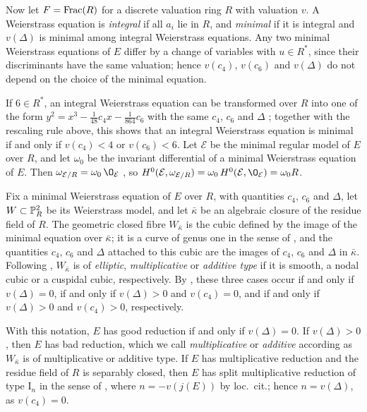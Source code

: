 Now let $F = \operatorname{Frac}(R)$ for a discrete valuation ring $R$ with valuation $v$.
A Weierstrass equation is \emph{integral} if all $a_i$ lie in $R$, and \emph{minimal} if it is integral and $v(\Delta)$ is minimal among integral Weierstrass equations.
Any two minimal Weierstrass equations of $E$ differ by a change of variables with $u\in R^*$, since their discriminants have the same valuation; hence $v(c_4)$, $v(c_6)$ and $v(\Delta)$ do not depend on the choice of the minimal equation.

If $6\in R^*$, an integral Weierstrass equation can be transformed over $R$ into one of the form $y^2 = x^3-\tfrac{1}{48}c_4x-\tfrac{1}{864}c_6$ with the same $c_4$, $c_6$ and $\Delta$ \cite[(2.1) and (2.2)]{Del75}; together with the rescaling rule above, this shows that an integral Weierstrass equation is minimal if and only if $v(c_4)<4$ or $v(c_6)<6$.
Let $\mathcal E$ be the minimal regular model of $E$ over $R$, and let $\omega_0$ be the invariant differential of a minimal Weierstrass equation of $E$.
Then $\omega_{\mathcal E/R} = \omega_0\,\O_{\mathcal E}$ \cite[Corollary~9.4.37]{Liu02}, so $H^0(\mathcal E,\omega_{\mathcal E/R}) = \omega_0\,H^0(\mathcal E,\O_{\mathcal E}) = \omega_0R$.

Fix a minimal Weierstrass equation of $E$ over $R$, with quantities $c_4$, $c_6$ and $\Delta$, let $W\subset\mathbb{P}^2_R$ be its Weierstrass model, and let $\bar\kappa$ be an algebraic closure of the residue field of $R$.
The geometric closed fibre $W_{\bar\kappa}$ is the cubic defined by the image of the minimal equation over $\bar\kappa$; it is a curve of genus one in the sense of \cite[\S1]{Del75}, and the quantities $c_4$, $c_6$ and $\Delta$ attached to this cubic are the images of $c_4$, $c_6$ and $\Delta$ in $\bar\kappa$.
Following \cite[\S1]{Del75}, $W_{\bar\kappa}$ is of \emph{elliptic}, \emph{multiplicative} or \emph{additive type} if it is smooth, a nodal cubic or a cuspidal cubic, respectively.
By \cite[Proposition~5.1]{Del75}, these three cases occur if and only if $v(\Delta) = 0$, if and only if $v(\Delta)>0$ and $v(c_4) = 0$, and if and only if $v(\Delta)>0$ and $v(c_4)>0$, respectively.

With this notation, $E$ has good reduction if and only if $v(\Delta) = 0$.
If $v(\Delta)>0$, then $E$ has bad reduction, which we call \emph{multiplicative} or \emph{additive} according as $W_{\bar\kappa}$ is of multiplicative or additive type.
If $E$ has multiplicative reduction and the residue field of $R$ is separably closed, then $E$ has split multiplicative reduction of type $\mathrm I_n$ in the sense of \cite[Section~8]{LLR04}, where $n = -v(j(E))$ by loc.\ cit.; hence $n = v(\Delta)$, as $v(c_4) = 0$.

